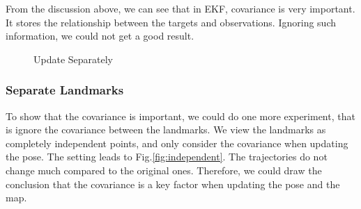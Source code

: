 \documentclass[conference]{IEEEtran}
\begin{document}
From the discussion above, we can see that in EKF, covariance is very important. It stores the relationship between the 
targets and observations. Ignoring such information, we could not get a good result.

\begin{figure}[htbp]
    \centering

    \centering
    \caption{Update Separately} \label{fig:slam_separate}
\end{figure}

\subsubsection{Separate Landmarks}
To show that the covariance is important, we could do one more experiment, that is ignore the covariance between the 
landmarks. We view the landmarks as completely independent points, and only consider the covariance when updating the
pose. The setting leads to Fig.\ref{fig:independent}. The trajectories do not change much compared to the original ones.
Therefore, we could draw the conclusion that the covariance is a key factor when updating the pose and the map.
\end{document}
